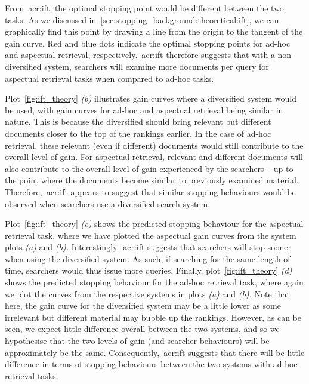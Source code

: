 From~\gls{acr:ift}, the optimal stopping point would be different between the two tasks. As we discussed in~\ref{sec:stopping_background:theoretical:ift}, we can graphically find this point by drawing a line from the origin to the tangent of the gain curve. Red and blue dots indicate the optimal stopping points for ad-hoc and aspectual retrieval, respectively.~\gls{acr:ift} therefore suggests that with a non-diversified system, searchers will examine more documents per query for aspectual retrieval tasks when compared to ad-hoc tasks.

Plot~\ref{fig:ift_theory} \emph{(b)} illustrates gain curves where a diversified system would be used, with gain curves for ad-hoc and aspectual retrieval being similar in nature. This is because the diversified should bring relevant but different documents closer to the top of the rankings earlier. In the case of ad-hoc retrieval, these relevant (even if different) documents would still contribute to the overall level of gain. For aspectual retrieval, relevant and different documents will also contribute to the overall level of gain experienced by the searchers -- up to the point where the documents become similar to previously examined material. Therefore,~\gls{acr:ift} appears to suggest that similar stopping behaviours would be observed when searchers use a diversified search system.

Plot~\ref{fig:ift_theory} \emph{(c)} shows the predicted stopping behaviour for the aspectual retrieval task, where we have plotted the aspectual gain curves from the system plots \emph{(a)} and \emph{(b).} Interestingly,~\gls{acr:ift} suggests that searchers will stop sooner when using the diversified system. As such, if searching for the same length of time, searchers would thus issue more queries. Finally, plot~\ref{fig:ift_theory} \emph{(d)} shows the predicted stopping behaviour for the ad-hoc retrieval task, where again we plot the curves from the respective systems in plots \emph{(a)} and \emph{(b).} Note that here, the gain curve for the diversified system may be a little lower as some irrelevant but different material may bubble up the rankings. However, as can be seen, we expect little difference overall between the two systems, and so we hypothesise that the two levels of gain (and searcher behaviours) will be approximately be the same. Consequently,~\gls{acr:ift} suggests that there will be little difference in terms of stopping behaviours between the two systems with ad-hoc retrieval tasks.

